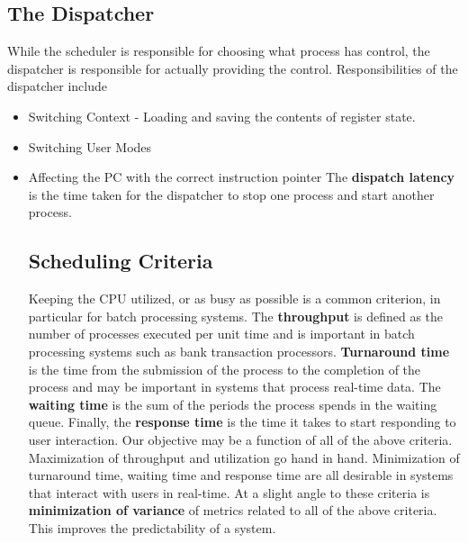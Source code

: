 \documentclass[10pt,a4paper]{article}
\begin{document}
\subsection{The Dispatcher}
While the scheduler is responsible for choosing what process has control, the dispatcher is responsible for actually providing the control. Responsibilities of the dispatcher include 
\begin{itemize}
\item Switching Context - Loading and saving the contents of register state. 
\item Switching User Modes 
\item Affecting the PC with the correct instruction pointer
The {\bf dispatch latency} is the time taken for the dispatcher to stop one process and start another process. 
\subsection{Scheduling Criteria}
Keeping the CPU utilized, or as busy as possible is a common criterion, in particular for batch processing systems. The {\bf throughput} is defined as the number of processes executed per unit time and is important in batch processing systems such as bank transaction processors. {\bf Turnaround time} is the time from the submission of the process to the completion of the process and may be important in systems that process real-time data. The {\bf waiting time} is the sum of the periods the process spends in the waiting queue. Finally, the {\bf response time} is the time it takes to start responding to user interaction. 
\newline\newline
Our objective may be a function of all of the above criteria. Maximization of throughput and utilization go hand in hand. Minimization of turnaround time, waiting time and response time are all desirable in systems that interact with users in real-time. At a slight angle to these criteria is {\bf minimization of variance} of metrics related to all of the above criteria. This improves the predictability of a system. 

\end{itemize}
\end{document}
